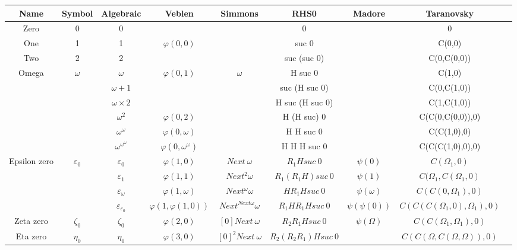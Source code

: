 \documentclass[10pt]{article}
\begin{document}
\begin{tabular}{|c|c|c|c|c|c|c|c|c|}
\hline
Name		& Symbol		& Algebraic			& Veblen			& Simmons			& RHS0 		& Madore				& Taranovsky 			\\
\hline
Zero		& 0			& 0				& 				& 				& 0			& 					& 0				\\ \hline
One		& 1			& 1				& \(\varphi(0,0)\)		& 				& suc 0			& 					& C(0,0)			\\ \hline
Two		& 2			& 2				& 				& 				& suc (suc 0)		& 					& C(0,C(0,0))			\\ \hline
Omega		& \(\omega\)		& \(\omega\)			& \(\varphi(0,1)\)		& \(\omega\)			& H suc 0		& 					& C(1,0)			\\ \hline
		& 			& \(\omega+1\)			& 				& 				& suc (H suc 0)		& 					& C(0,C(1,0))			\\ \hline
		&			& \(\omega\times2\)		&				& 				& H suc (H suc 0)	& 					& C(1,C(1,0))			\\ \hline
		&			& \(\omega^2\)			& \(\varphi(0,2)\)		& 				& H (H suc) 0		& 					& C(C(0,C(0,0)),0)		\\ \hline
		&			& \(\omega^\omega\)		& \(\varphi(0,\omega)\)		& 				& H H suc 0		& 					& C(C(1,0),0)			\\ \hline
		&			& \(\omega^{\omega^\omega}\)	& \(\varphi(0,\omega^\omega)\)	&				& H H H suc 0		&					& C(C(C(1,0),0),0)		\\ \hline
Epsilon zero	& \(\varepsilon_0\)	& \(\varepsilon_0\)		& \(\varphi(1,0)\)		& \(Next\ \omega\)		& \(R_1 H suc\ 0\)	& \(\psi(0)\)				& \(C(\Omega_1,0)\)		\\ \hline
		& 			& \(\varepsilon_1\)		& \(\varphi(1,1)\)		& \(Next^2 \omega\)	& \(R_1 (R_1 H) suc\ 0\)& \(\psi(1)\)				& \(C(\Omega_1,C(\Omega_1,0)\)	\\ \hline
		& 			& \(\varepsilon_\omega\)	& \(\varphi(1,\omega)\) 	& \(Next^\omega \omega\) & \(H R_1 H suc\ 0\)	& \(\psi(\omega)\)			& \(C(C(0,\Omega_1),0)\)	\\ \hline
		& 			&\(\varepsilon_{\varepsilon_0}\)& \(\varphi(1,\varphi(1,0))\)	& \(Next^{Next \omega} \omega \) & \(R_1 H R_1 H suc\ 0\)& \(\psi(\psi(0))\)			& \(C(C(C(\Omega_1,0),\Omega_1),0)\)\\ \hline
Zeta zero	& \(\zeta_0\)		& \(\zeta_0\)			& \(\varphi(2,0)\)		& \([0] Next\ \omega\)		& \(R_2 R_1 H suc\ 0\)	& \(\psi(\Omega)\)			& \(C(C(\Omega_1,\Omega_1),0)\)	\\ \hline
Eta zero	& \(\eta_0\)		& \(\eta_0\)			& \(\varphi(3,0)\)		& \([0]^2 Next\ \omega\) 	& \(R_2 (R_2 R_1) H suc\ 0\)&					& \(C(C(\Omega,C(\Omega,\Omega)),0)\) \\ \hline

\end{tabular}
\end{document}

